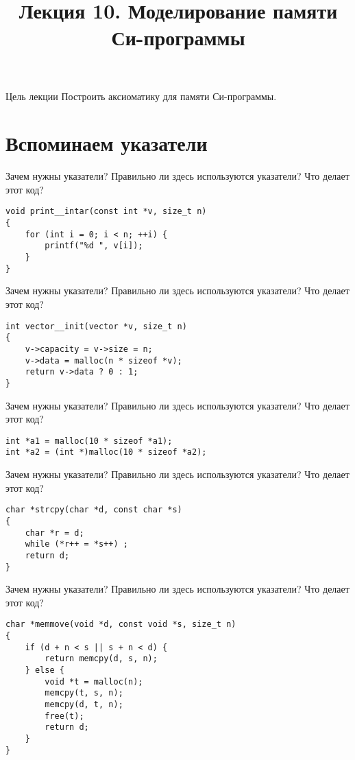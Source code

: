 \documentclass[hyperref={unicode=true}]{beamer}
\title{Лекция 10. Моделирование памяти Си-программы}
\author{}
\date{}
\begin{document}
	\begin{frame}{}
		\titlepage
	\end{frame}

    \begin{frame}{Цель лекции}
    Построить аксиоматику для памяти Си-программы.
    \end{frame}

    \section{Вспоминаем указатели}

    \begin{frame}[fragile]{Зачем нужны указатели?}
    Правильно ли здесь используются указатели?
    Что делает этот код?
    \begin{lstlisting}
void print__intar(const int *v, size_t n)
{
    for (int i = 0; i < n; ++i) {
        printf("%d ", v[i]);
    }
}
    \end{lstlisting}
    \end{frame}

    \begin{frame}[fragile]{Зачем нужны указатели?}
    Правильно ли здесь используются указатели?
    Что делает этот код?
    \begin{lstlisting}
int vector__init(vector *v, size_t n)
{
    v->capacity = v->size = n;
    v->data = malloc(n * sizeof *v);
    return v->data ? 0 : 1;
}
    \end{lstlisting}
    \end{frame}

    \begin{frame}[fragile]{Зачем нужны указатели?}
    Правильно ли здесь используются указатели?
    Что делает этот код?
    \begin{lstlisting}
int *a1 = malloc(10 * sizeof *a1);
int *a2 = (int *)malloc(10 * sizeof *a2);
    \end{lstlisting}
    \end{frame}

    \begin{frame}[fragile]{Зачем нужны указатели?}
    Правильно ли здесь используются указатели?
    Что делает этот код?
    \begin{lstlisting}
char *strcpy(char *d, const char *s)
{
    char *r = d;
    while (*r++ = *s++) ;
    return d;
}
    \end{lstlisting}
    \end{frame}

    \begin{frame}[fragile]{Зачем нужны указатели?}
    Правильно ли здесь используются указатели?
    Что делает этот код?
    \begin{lstlisting}
char *memmove(void *d, const void *s, size_t n)
{
    if (d + n < s || s + n < d) {
        return memcpy(d, s, n);
    } else {
        void *t = malloc(n);
        memcpy(t, s, n);
        memcpy(d, t, n);
        free(t);
        return d;
    }
}
    \end{lstlisting}
    \end{frame}
\end{document}
